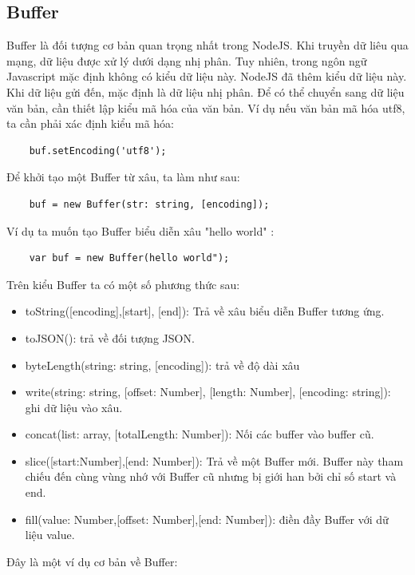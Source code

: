 	\subsection{Buffer}
		Buffer là đối tượng cơ bản quan trọng nhất trong NodeJS. Khi truyền dữ liêu qua mạng, dữ liệu được xử lý dưới dạng nhị phân. Tuy nhiên, trong ngôn ngữ Javascript mặc định không có kiểu dữ liệu này. NodeJS đã thêm kiểu dữ liệu này. Khi dữ liệu gửi đến, mặc định là dữ liệu nhị phân. Để có thể chuyển sang dữ liệu văn bản, cần thiết lập kiểu mã hóa của văn bản. Ví dụ nếu văn bản mã hóa utf8, ta cần phải xác định kiểu mã hóa:\\
		\begin{verbatim}
	buf.setEncoding('utf8');
		\end{verbatim}
		
		Để khởi tạo một Buffer từ xâu, ta làm như sau:\\
		\begin{verbatim}
	buf = new Buffer(str: string, [encoding]);
		\end{verbatim}
		
		Ví dụ ta muốn tạo Buffer biểu diễn xâu "hello world" :
		\begin{verbatim}
	var buf = new Buffer(hello world");
		\end{verbatim}
		
		Trên kiểu Buffer ta có một số phương thức sau:
		\begin{itemize}
			\item toString([encoding],[start], [end]): Trả về xâu biểu diễn Buffer tương ứng.
			\item toJSON(): trả về đối tượng JSON.
			\item byteLength(string: string, [encoding]): trả về độ dài xâu
			\item write(string: string, [offset: Number], [length: Number], [encoding: string]): ghi dữ liệu vào xâu.
			\item concat(list: array, [totalLength: Number]): Nối các buffer vào buffer cũ.
			\item slice([start:Number],[end: Number]): Trả về một Buffer mới. Buffer này  tham chiếu đến cùng vùng nhớ với Buffer cũ nhưng bị giới han bởi chỉ số start và end.
			\item fill(value: Number,[offset: Number],[end: Number]): điền đầy Buffer với dữ liệu value.
		\end{itemize}
		
		Đây là một ví dụ cơ bản về Buffer:

